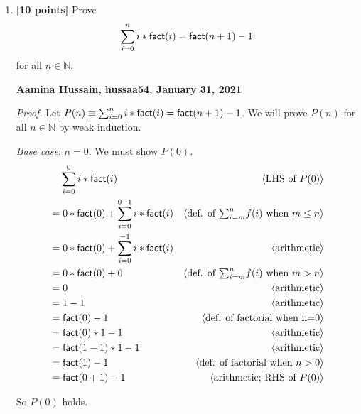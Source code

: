 \documentclass[11pt,fleqn]{article}
\newcommand{\mname}[1]{\mbox{\sf #1}}
\newcommand{\pnote}[1]{{\langle \text{#1} \rangle}}
\begin{document}
\begin{enumerate}

  \item \textbf{[10 points]} Prove \[\sum^{n}_{i = 0} i *
    \mname{fact}(i) = \mname{fact}(n+1) - 1\] for all $n \in
    \mathbb{N}$.

  \bigskip

  \textbf{Aamina Hussain, hussaa54, January 31, 2021}

  \emph{Proof.} Let $P(n) \equiv \sum^{n}_{i = 0} i *
    \mname{fact}(i) = \mname{fact}(n+1) - 1$. We will prove $P(n)$ for all $n \in
    \mathbb{N}$ by weak induction.
    
    \medskip

  \emph{Base case}: $n = 0$.  We must show $P(0)$.
  \begin{align*}
    &\phantom{{}=} \sum_{i=0}^{0} i * \mname{fact}(i) & \pnote{LHS of $P(0)$}\\
    &= 0*\mname{fact}(0) + \sum_{i=0}^{0-1} i * \mname{fact}(i)  & \pnote{def. of $\textstyle{\sum}_{i=m}^{n} f(i)$ when $m \le n$}\\
    &= 0*\mname{fact}(0) + \sum_{i=0}^{-1} i * \mname{fact}(i)          & \pnote{arithmetic}\\
    &= 0*\mname{fact}(0) + 0      & \pnote{def. of $\textstyle{\sum}_{i=m}^{n} f(i)$ when $m > n$}\\
    &= 0    & \pnote{arithmetic}\\
    &= 1-1    & \pnote{arithmetic}\\
    &= \mname{fact}(0)-1    & \pnote{def. of factorial when n=0}\\
    &= \mname{fact}(0)*1-1    & \pnote{arithmetic}\\
    &= \mname{fact}(1-1)*1-1    & \pnote{arithmetic}\\
    &= \mname{fact}(1)-1    & \pnote{def. of factorial when $n > 0$}\\
    &= \mname{fact}(0+1)-1    & \pnote{arithmetic; RHS of $P(0)$}
  \end{align*}

  So $P(0)$ holds.

  \medskip


\end{enumerate}
\end{document}
